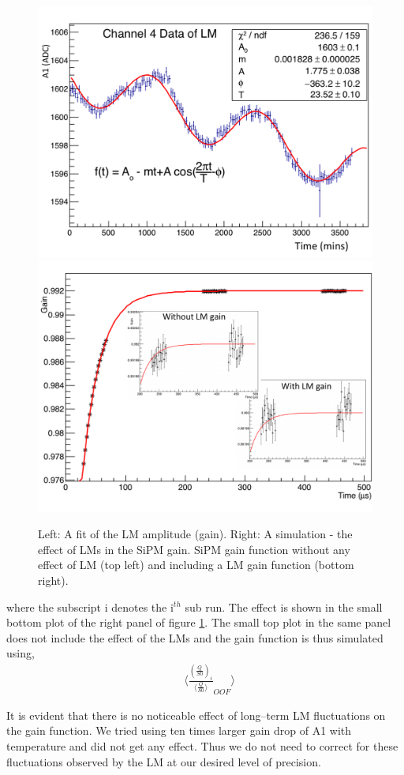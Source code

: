 \documentclass[article,accept,moreauthors,pdftex,10pt,a4paper]{Definitions/mdpi}
\begin{document}
\begin{figure}[H]
\centering
\includegraphics[width=7 cm]{LM_gain.pdf}
\includegraphics[width=7 cm]{gain_sim.pdf}
\caption{\label{fig7}Left: A fit of the LM amplitude (gain). Right: A simulation - the effect of LMs in the SiPM gain. 
SiPM gain function without any effect of LM (top left) and including a LM gain function (bottom right). }
\end{figure}  
where the subscript i denotes the i$^{th}$ sub run. The effect is shown in the small bottom plot of the 
right panel of figure \ref{fig7}. 
The small top plot in the same panel does not include the effect of the LMs and the gain function is thus simulated using,
\begin{equation}	
  			\begin{aligned}	
    			&\Bigg \langle \frac {(\frac{Q}{S0})_{i}}{\langle {\frac{Q}{S0}}\rangle}_{OOF} \Bigg \rangle
			\end{aligned}
		\end{equation}  

It is evident that there is no noticeable effect of long--term LM fluctuations on the gain function. 
We tried using ten times larger gain drop of A1 with temperature and did not get any effect. 
Thus we do not need to correct for these fluctuations observed by the LM at our desired level of precision. 
\end{document}
